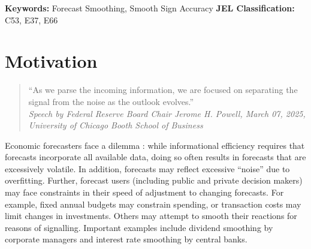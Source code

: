 \documentclass[11pt,a4paper]{article}
\begin{document}
\bigskip \vspace{10pt}
\textbf{Keywords:} Forecast Smoothing, Smooth Sign Accuracy 
\newline
\textbf{JEL Classification:} C53, E37, E66
\thispagestyle{empty}


\onehalfspacing
\renewcommand{\thepage}{\arabic{page}} \setcounter{page}{1}
\newpage
\section{Motivation}\label{sec:motivation}

\begin{quote}
     \quad ``As we parse the incoming information, we are focused on separating the signal from the noise as the outlook evolves.''\\
    \textit{Speech by Federal Reserve Board Chair Jerome H. Powell, March 07, 2025, \\
    University of Chicago Booth School of Business}
\end{quote}


Economic forecasters face a dilemma
: while informational efficiency requires that forecasts incorporate all available data, doing so often results in forecasts that are excessively volatile.
 In addition, forecasts may reflect excessive ``noise'' due to overfitting. Further, forecast users (including public and private decision makers) may face constraints in their speed of adjustment to changing forecasts. For example, fixed annual budgets may constrain spending, or transaction costs may limit changes in investments. Others may attempt to smooth their reactions for reasons of signalling. Important examples include dividend smoothing by corporate managers and interest rate smoothing by central banks.
\end{document}
